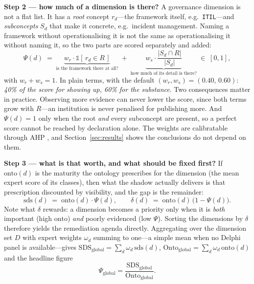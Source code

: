 \documentclass[engproc,article,submit,moreauthors]{Definitions/mdpi}
\begin{document}
\textbf{Step 2 --- how much of a dimension is there?} A governance dimension is not a flat list. It has a \emph{root} concept $r_d$---the framework itself, e.g.\ \texttt{ITIL}---and \emph{subconcepts} $S_d$ that make it concrete, e.g.\ incident management. Naming a framework without operationalising it is not the same as operationalising it without naming it, so the two parts are scored separately and added:
\begin{equation}
\Psi(d) \;=\; \underbrace{w_r \cdot \mathbb{1}\!\left[\, r_d \in R \,\right]}_{\text{is the framework there at all?}} \;+\; \underbrace{w_s \cdot \frac{\lvert S_d \cap R \rvert}{\lvert S_d \rvert}}_{\text{how much of its detail is there?}}\;\in\;[0,1],
\label{eq:psi}
\end{equation}
with $w_r+w_s=1$. In plain terms, with the default $(w_r,w_s)=(0.40,\,0.60)$: \emph{40\% of the score for showing up, 60\% for the substance}. Two consequences matter in practice. Observing more evidence can never lower the score, since both terms grow with $R$---an institution is never penalised for publishing more. And $\Psi(d)=1$ only when the root \emph{and} every subconcept are present, so a perfect score cannot be reached by declaration alone. The weights are calibratable through AHP \cite{Saaty1990}, and Section~\ref{sec:results} shows the conclusions do not depend on them.

\textbf{Step 3 --- what is that worth, and what should be fixed first?} If $\mathrm{onto}(d)$ is the maturity the ontology prescribes for the dimension (the mean expert score of its classes), then what the shadow actually delivers is that prescription discounted by visibility, and the gap is the remainder:
\begin{equation}
\mathrm{sds}(d) \;=\; \mathrm{onto}(d)\cdot\Psi(d),
\qquad
\delta(d) \;=\; \mathrm{onto}(d)\,\bigl(1-\Psi(d)\bigr).
\label{eq:delta}
\end{equation}
Note what $\delta$ rewards: a dimension becomes a priority only when it is \emph{both} important (high $\mathrm{onto}$) \emph{and} poorly evidenced (low $\Psi$). Sorting the dimensions by $\delta$ therefore yields the remediation agenda directly. Aggregating over the dimension set $D$ with expert weights $\omega_d$ summing to one---a simple mean when no Delphi panel is available---gives $\mathrm{SDS}_{\mathrm{global}}=\sum_d \omega_d\,\mathrm{sds}(d)$, $\mathrm{Onto}_{\mathrm{global}}=\sum_d \omega_d\,\mathrm{onto}(d)$ and the headline figure
\begin{equation}
\Psi_{\mathrm{global}}=\frac{\mathrm{SDS}_{\mathrm{global}}}{\mathrm{Onto}_{\mathrm{global}}}.
\label{eq:global}
\end{equation}
\end{document}
